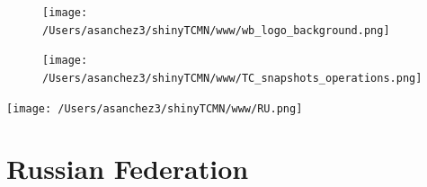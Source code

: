 \documentclass{article}\usepackage[]{graphicx}\usepackage[]{color}
\begin{document}
\newpage

\begin{figure}
  \vspace{-3ex} %
  \hspace{-7ex} %
  \texttt{[image: /Users/asanchez3/shinyTCMN/www/wb\_logo\_background.png]}
\end{figure}
\begin{figure}
  \begin{minipage}[t]{0.99\textwidth} %
      \vspace{-30ex}
      \hspace{-2ex}
      \raggedright{\texttt{[image: /Users/asanchez3/shinyTCMN/www/TC\_snapshots\_operations.png]}}
  \end{minipage}
\end{figure}
%
\begin{minipage}[t]{0.99\textwidth} %
  \vspace{-1.5cm}
  \begin{minipage}[c]{0.36\textwidth} 
    \begin{minipage}[c]{0.28\textwidth} %
      \texttt{[image: /Users/asanchez3/shinyTCMN/www/RU.png]}
    \end{minipage}
    \begin{minipage}[c]{0.70\textwidth} %
      \section*{\color{blue!40!black}Russian Federation}
    \end{minipage}
  \end{minipage}
  \begin{minipage}[c]{0.63\textwidth}
  \end{minipage}  
\end{minipage} %
\end{document}

